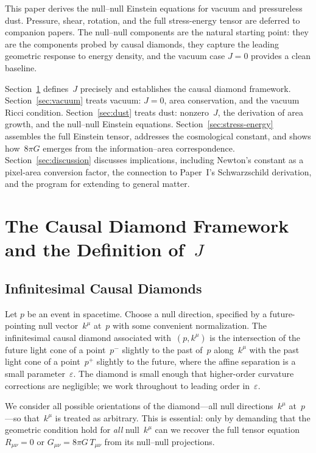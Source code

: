 \documentclass[12pt]{article}
\begin{document}
This paper derives the null--null Einstein equations for vacuum
and pressureless dust.
Pressure, shear, rotation, and the full stress-energy tensor
are deferred to companion papers.
The null--null components are the natural starting point:
they are the components probed by causal diamonds,
they capture the leading geometric response to energy density,
and the vacuum case $J=0$ provides a clean baseline.

Section~\ref{sec:diamond} defines~$J$ precisely and establishes
the causal diamond framework.
Section~\ref{sec:vacuum} treats vacuum: $J=0$, area conservation,
and the vacuum Ricci condition.
Section~\ref{sec:dust} treats dust: nonzero~$J$, the derivation
of area growth, and the null--null Einstein equations.
Section~\ref{sec:stress-energy} assembles the full Einstein tensor,
addresses the cosmological constant, and shows how~$8\pi G$
emerges from the information--area correspondence.
Section~\ref{sec:discussion} discusses implications, including
Newton's constant as a pixel-area conversion factor, the
connection to Paper~I's Schwarzschild derivation, and the
program for extending to general matter.

\section{The Causal Diamond Framework and the Definition of~$J$}
\label{sec:diamond}

\subsection{Infinitesimal Causal Diamonds}

Let $p$ be an event in spacetime.
Choose a null direction, specified by a future-pointing null
vector~$k^\mu$ at~$p$ with some convenient normalization.
The infinitesimal causal diamond associated with~$(p, k^\mu)$
is the intersection of the future light cone of a point~$p^-$
slightly to the past of~$p$ along~$k^\mu$ with the past light
cone of a point~$p^+$ slightly to the future, where the
affine separation is a small parameter~$\varepsilon$.
The diamond is small enough that higher-order curvature
corrections are negligible; we work throughout to leading
order in~$\varepsilon$.

We consider all possible orientations of the diamond---all
null directions~$k^\mu$ at~$p$---so that~$k^\mu$ is treated
as arbitrary.
This is essential: only by demanding that the geometric
condition hold for \emph{all} null~$k^\mu$ can we recover
the full tensor equation $R_{\mu\nu}=0$ or
$G_{\mu\nu}=8\pi G\,T_{\mu\nu}$ from its null--null
projections.
\end{document}
